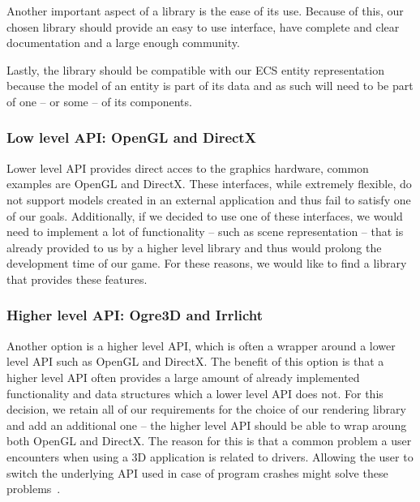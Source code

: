 Another important aspect of a library is the ease of its use. Because of this, our chosen library should provide an easy to use
interface, have complete and clear documentation and a large enough community.

Lastly, the library should be compatible with our ECS entity representation because the model of an entity is part of its data and
as such will need to be part of one -- or some -- of its components.

\subsubsection{Low level API: OpenGL and DirectX}

Lower level API provides direct acces to the graphics hardware, common examples are OpenGL and DirectX. These interfaces, while
extremely flexible, do not support models created in an external application and thus fail to satisfy one of our goals. Additionally,
if we decided to use one of these interfaces, we would need to implement a lot of functionality -- such as scene representation -- that 
is already provided to us by a higher level library and thus would prolong the development time of our game. For these reasons, we would
like to find a library that provides these features.

\subsubsection{Higher level API: Ogre3D and Irrlicht}

Another option is a higher level API, which is often a wrapper around
a lower level API such as OpenGL and DirectX. The benefit of this option is that a higher level API often provides a large amount
of already implemented functionality and data structures which a lower level API does not. For this decision, we retain all of our
requirements for the choice of our rendering
library and add an additional one -- the higher level API should be able to wrap aroung both OpenGL and DirectX. The reason for this is
that a common problem a user encounters when using a 3D application is related to drivers. Allowing the user to switch the underlying
API used in case of program crashes might solve these problems~\cite{BothOpenGLAndDirectX}.

